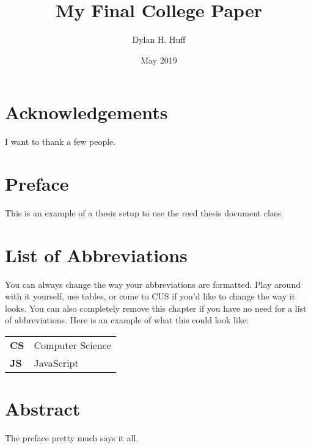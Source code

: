 \documentclass[12pt,twoside]{reedthesis}
\title{My Final College Paper}
\author{Dylan H. Huff}
\date{May 2019}
\begin{document}
  \maketitle
  \frontmatter %
  \pagestyle{empty} %

    \chapter*{Acknowledgements}
	I want to thank a few people.

    \chapter*{Preface}
	This is an example of a thesis setup to use the reed thesis document class.
	
	

    \chapter*{List of Abbreviations}
		You can always change the way your abbreviations are formatted. Play around with it yourself, use tables, or come to CUS if you'd like to change the way it looks. You can also completely remove this chapter if you have no need for a list of abbreviations. Here is an example of what this could look like:

	\begin{table}[h]
	\centering %
	\begin{tabular}{ll}
		\textbf{CS}   & Computer Science\\
		\textbf{JS}  	&  JavaScript\\
	\end{tabular}
	\end{table}
	

    \tableofcontents
    \listoftables
    \listoffigures

    \chapter*{Abstract}
	The preface pretty much says it all.
	
\end{document}
